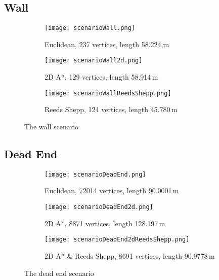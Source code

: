 \subsection{Wall}

\begin{figure}[h]
    \centering
    \begin{subfigure}[t]{\textwidth}
        \texttt{[image: scenarioWall.png]}
        \caption{Euclidean, 237 vertices, length 58.224,m}
        \label{fig:scenarioWall}
    \end{subfigure}
    \begin{subfigure}[t]{\textwidth}
        \texttt{[image: scenarioWall2d.png]}
        \caption{2D A*, 129 vertices, length 58.914\,m}
        \label{fig:scenarioWall2d}
    \end{subfigure}    
    \begin{subfigure}[t]{\textwidth}
        \texttt{[image: scenarioWallReedsShepp.png]}
        \caption{Reeds Shepp, 124 vertices, length 45.780\,m}
        \label{fig:scenarioWallReedsShepp}
    \end{subfigure}
    \caption{The wall scenario}
    \label{fig:scenarioWall}
\end{figure}

\subsection{Dead End}

\begin{figure}[h]
    \centering
    \begin{subfigure}[t]{\textwidth}
        \texttt{[image: scenarioDeadEnd.png]}
        \caption{Euclidean, 72014 vertices, length 90.0001\,m}
        \label{fig:scenarioDeadEnd}
    \end{subfigure}
    \begin{subfigure}[t]{\textwidth}
        \texttt{[image: scenarioDeadEnd2d.png]}
        \caption{2D A*, 8871 vertices, length 128.197\,m}
        \label{fig:scenarioDeadEnd2d}
    \end{subfigure}    
    \begin{subfigure}[t]{\textwidth}
        \texttt{[image: scenarioDeadEnd2dReedsShepp.png]}
        \caption{2D A* \& Reeds Shepp, 8691 vertices, length 90.9778\,m}
        \label{fig:scenarioDeadEnd2dReedsShepp}
    \end{subfigure}
    \caption{The dead end scenario}
    \label{fig:scenarioDeadEnd}
\end{figure}

